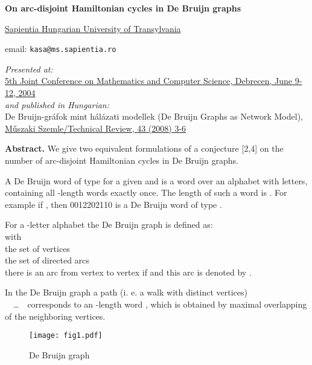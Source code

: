 \documentclass[10pt]{article}
\begin{document}
 
\begin{center}

\textbf{\LARGE On arc-disjoint Hamiltonian cycles in De Bruijn graphs}


\href{http://www.emte.ro}{Sapientia Hungarian University of Transylvania}

email: \texttt{kasa@ms.sapientia.ro}

\bigskip \emph{Presented at:} \\
\href{http://riesz.math.klte.hu/~macs/abstracts.pdf}{5th Joint Conference on Mathematics and Computer Science, Debrecen, June 9-12, 2004} \\
 \emph{and  published in Hungarian:}\\ De Bruijn-gr\'afok mint h\'al\'azati modellek (De Bruijn Graphs as Network Model), \href{http://www.emt.ro/downloads/muszaki_szemle/msz43.pdf}{M\H{u}szaki Szemle/Technical Review, 43 (2008) 3-6} 
\end{center}

\bigskip
{\small
\noindent\textbf{Abstract.} We give two equivalent formulations of a conjecture [2,4] on the number of arc-disjoint Hamiltonian cycles in De Bruijn graphs. 
}

\bigskip\noindent
A De Bruijn word  of type  for a given  and  is a word over an alphabet with  letters, containing all  -length words exactly once. The length of such a word is . 
For example if , then  0012202110 is a De Bruijn word of type .

\medskip\noindent
For a -letter alphabet  the De Bruijn graph  is defined as:\\

with \\
 {}   \quad the set of vertices
\\
 {}  the set of directed arcs
\\
 there is an arc from vertex {} to  vertex {}  if 
{} 
and this arc is denoted by {}. 
      
\medskip\noindent
In the De Bruijn graph  a path (i. e. a walk with distinct vertices)
  \   \  
\ldots \  \   
corresponds to an -length word 
 {},
 which 
is obtained by maximal overlapping of the neighboring vertices. 

\begin{figure}[t]
\centering\texttt{[image: fig1.pdf]}
\label{br22}\caption{De Bruijn graph } 
\end{figure}
\end{document}
